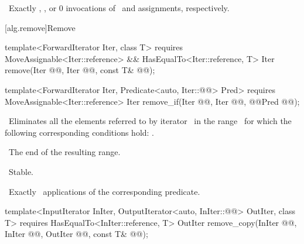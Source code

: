 \documentclass[american,twoside]{book}
\begin{document}
\begin{paras}
\begin{itemdescr}
\pnum
{} 

\pnum
\complexity\ 
Exactly
,
, or 0
invocations of \ and assignments, respectively.
\end{itemdescr}

[alg.remove]{Remove}

%
%
\color{addclr}\begin{itemdecl}
template<ForwardIterator Iter, class T>
  requires MoveAssignable<Iter::reference> && HasEqualTo<Iter::reference, T>
  Iter remove(Iter @\farg{first}@, Iter @\farg{last}@,
              const T& @@);

template<ForwardIterator Iter, Predicate<auto, Iter::@@> Pred>
  requires MoveAssignable<Iter::reference>
  Iter remove_if(Iter @@, Iter @@,
                 @\textcolor{addclr}{}@Pred @@);
\end{itemdecl}\color{black}

\begin{itemdescr}
\pnum
{}

\textcolor{black}{\pnum}
\effects\ 
Eliminates all the elements referred to by iterator
\
in the range \
for which the following corresponding conditions hold:
\tcode{*i == \farg{value}, \farg{pred}(*i) != false}.

\pnum
\returns\ 
The end of the resulting range.

\textcolor{black}{\pnum}
\notes\ 
Stable.

\pnum
\textcolor{black}{}\complexity\ 
Exactly
\
applications of the corresponding predicate.
\end{itemdescr}

%
%
\color{addclr}\begin{itemdecl}
template<InputIterator InIter, OutputIterator<auto, InIter::@@> OutIter, class T>
  requires HasEqualTo<InIter::reference, T>
  OutIter remove_copy(InIter @\farg{first}@, InIter @@,
                      OutIter @@, const T& @@);


\end{itemdecl}
\end{paras}
\end{document}
